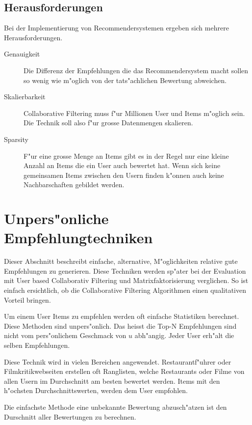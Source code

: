 \documentclass[a4paper, 12pt]{article}
\begin{document}
\subsection{Herausforderungen}
\label{sec:challenges}

Bei der Implementierung von Recommendersystemen ergeben sich mehrere Herausforderungen.

\begin{description}
\item[Genauigkeit] Die Differenz der Empfehlungen die das Recommendersystem macht sollen so wenig wie m"oglich von der tats"achlichen Bewertung abweichen.
\item[Skalierbarkeit] 
Collaborative Filtering muss f"ur Millionen User und Items m"oglich sein. Die Technik soll also f"ur grosse Datenmengen skalieren.
\item[Sparsity] F"ur eine grosse Menge an Items gibt es in der Regel nur eine kleine Anzahl an Items die ein User auch bewertet hat. Wenn sich keine gemeinsamen Items zwischen den Usern finden k"onnen auch keine Nachbarschaften gebildet werden.
\end{description}

\section{Unpers"onliche Empfehlungtechniken}
\label{sec:simple}

Dieser Abschnitt beschreibt einfache, alternative, M"oglichkeiten relative gute Empfehlungen zu generieren. Diese Techniken werden sp"ater bei der Evaluation mit User based Collaborativ Filtering und Matrixfaktorisierung verglichen. So ist einfach ersichtlich, ob die Collaborative Filtering Algorithmen einen qualitativen Vorteil bringen.

Um einem User Items zu empfehlen werden oft einfache Statistiken berechnet. Diese Methoden sind unpers"onlich. Das heisst die Top-N Empfehlungen sind nicht vom pers"onlichem Geschmack von $u$ abh"angig. Jeder User erh"alt die selben Empfehlungen. 

Diese Technik wird in vielen Bereichen angewendet. Restaurantf"uhrer oder Filmkritikwebseiten erstellen oft Ranglisten, welche Restaurants oder Filme von allen Usern im Durchschnitt am besten bewertet werden. Items mit den h"ochsten Durchschnittswerten, werden dem User empfohlen.

Die einfachste Methode eine unbekannte Bewertung abzusch"atzen ist den Durschnitt aller Bewertungen zu berechnen.
\end{document}
